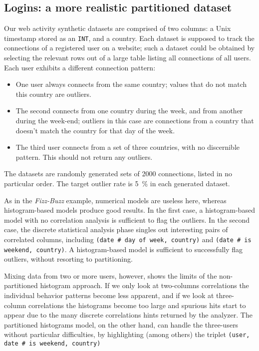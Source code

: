 \subsection{Logins: a more realistic partitioned dataset}

Our web activity synthetic datasets are comprised of two columns: a Unix timestamp stored as an \texttt{INT}, and a country. Each dataset is supposed to track the connections of a registered user on a website; such a dataset could be obtained by selecting the relevant rows out of a large table listing all connections of all users. Each user exhibits a different connection pattern:

\begin{itemize}
\item One user always connects from the same country; values that do not match this country are outliers.
\item The second connects from one country during the week, and from another during the week-end; outliers in this case are connections from a country that doesn't match the country for that day of the week.
\item The third user connects from a set of three countries, with no discernible pattern. This should not return any outliers.
\end{itemize}

The datasets are randomly generated sets of 2000 connections, listed in no particular order. The target outlier rate is \SI{5}{\percent} in each generated dataset.

\newcommand{\prop}[2]{#1\,\#\,#2}

As in the \emph{Fizz-Buzz} example, numerical models are useless here, whereas histogram-based models produce good results. In the first case, a histogram-based model with no correlation analysis is sufficient to flag the outliers. In the second case, the discrete statistical analysis phase singles out interesting pairs of correlated columns, including \texttt{(\prop{date}{day of week}, country)} and \texttt{(\prop{date}{is weekend}, country)}. A histogram-based model is sufficient to successfully flag outliers, without resorting to partitioning.


Mixing data from two or more users, however, shows the limits of the non-partitioned histogram approach. If we only look at two-columns correlations the individual behavior patterns become less apparent, and if we look at three-column correlations the histograms become too large and spurious hits start to appear due to the many discrete correlations hints returned by the analyzer. The partitioned histograms model, on the other hand, can handle the three-users without particular difficulties, by highlighting (among others) the triplet \texttt{(user, \prop{date}{is weekend}, country)}